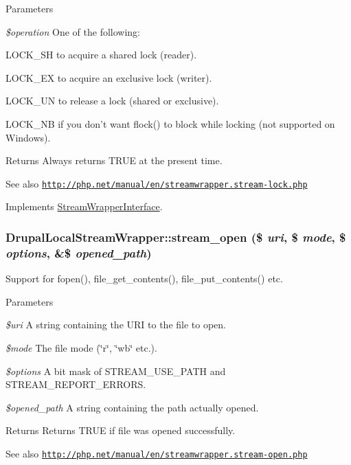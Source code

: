 \begin{DoxyParams}{Parameters}
\item[{\em \$operation}]One of the following:
\begin{DoxyItemize}
\item LOCK\_\-SH to acquire a shared lock (reader).
\item LOCK\_\-EX to acquire an exclusive lock (writer).
\item LOCK\_\-UN to release a lock (shared or exclusive).
\item LOCK\_\-NB if you don't want flock() to block while locking (not supported on Windows).
\end{DoxyItemize}\end{DoxyParams}
\begin{DoxyReturn}{Returns}
Always returns TRUE at the present time.
\end{DoxyReturn}
\begin{DoxySeeAlso}{See also}
\href{http://php.net/manual/en/streamwrapper.stream-lock.php}{\tt http://php.net/manual/en/streamwrapper.stream-\/lock.php} 
\end{DoxySeeAlso}


Implements \hyperlink{interfaceStreamWrapperInterface}{StreamWrapperInterface}.\hypertarget{classDrupalLocalStreamWrapper_ad4f1fe2a82a1939d4c2d94df90ce61b7}{
\subsubsection[{stream\_\-open}]{\setlength{\rightskip}{0pt plus 5cm}DrupalLocalStreamWrapper::stream\_\-open (\$ {\em uri}, \/  \$ {\em mode}, \/  \$ {\em options}, \/  \&\$ {\em opened\_\-path})}}
\label{classDrupalLocalStreamWrapper_ad4f1fe2a82a1939d4c2d94df90ce61b7}
Support for fopen(), file\_\-get\_\-contents(), file\_\-put\_\-contents() etc.


\begin{DoxyParams}{Parameters}
\item[{\em \$uri}]A string containing the URI to the file to open. \item[{\em \$mode}]The file mode (\char`\"{}r\char`\"{}, \char`\"{}wb\char`\"{} etc.). \item[{\em \$options}]A bit mask of STREAM\_\-USE\_\-PATH and STREAM\_\-REPORT\_\-ERRORS. \item[{\em \$opened\_\-path}]A string containing the path actually opened.\end{DoxyParams}
\begin{DoxyReturn}{Returns}
Returns TRUE if file was opened successfully.
\end{DoxyReturn}
\begin{DoxySeeAlso}{See also}
\href{http://php.net/manual/en/streamwrapper.stream-open.php}{\tt http://php.net/manual/en/streamwrapper.stream-\/open.php} 
\end{DoxySeeAlso}


